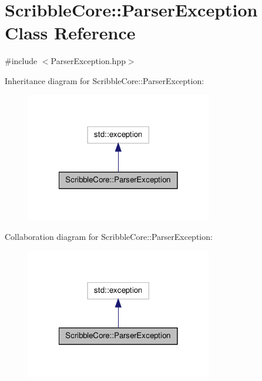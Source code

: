 \hypertarget{class_scribble_core_1_1_parser_exception}{\section{Scribble\-Core\-:\-:Parser\-Exception Class Reference}
\label{class_scribble_core_1_1_parser_exception}
}


{\ttfamily \#include $<$Parser\-Exception.\-hpp$>$}



Inheritance diagram for Scribble\-Core\-:\-:Parser\-Exception\-:\nopagebreak
\begin{figure}[H]
\begin{center}
\leavevmode
\includegraphics[width=230pt]{class_scribble_core_1_1_parser_exception__inherit__graph}
\end{center}
\end{figure}


Collaboration diagram for Scribble\-Core\-:\-:Parser\-Exception\-:\nopagebreak
\begin{figure}[H]
\begin{center}
\leavevmode
\includegraphics[width=230pt]{class_scribble_core_1_1_parser_exception__coll__graph}
\end{center}
\end{figure}
